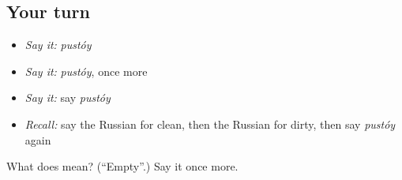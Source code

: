 \subsection*{Your turn}
\begin{itemize}
\raggedright
  \item \emph{Say it:} \emph{pustóy}
  \item \emph{Say it:} \emph{pustóy}, once more
  \item \emph{Say it:} say \emph{pustóy}
  \item \emph{Recall:} say the Russian for clean, then the Russian for dirty, then say \emph{pustóy} again
\end{itemize}

\begin{tcolorbox}[breakable,colback=teal!4,colframe=teal!35!black,title={Before you move on}]
What does  mean? (\textquotedblleft{}Empty\textquotedblright{}.) Say it once more.
\end{tcolorbox}
